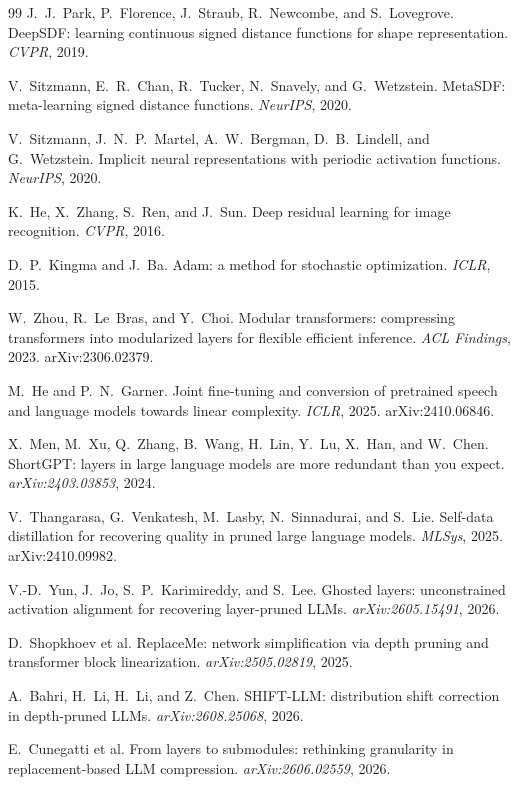 \documentclass[11pt]{article}
\begin{document}
\begin{thebibliography}{99}
J.~J.~Park, P.~Florence, J.~Straub, R.~Newcombe, and S.~Lovegrove.
DeepSDF: learning continuous signed distance functions for shape
representation.
\emph{CVPR}, 2019.

V.~Sitzmann, E.~R.~Chan, R.~Tucker, N.~Snavely, and G.~Wetzstein.
MetaSDF: meta-learning signed distance functions.
\emph{NeurIPS}, 2020.

V.~Sitzmann, J.~N.~P.~Martel, A.~W.~Bergman, D.~B.~Lindell, and
G.~Wetzstein.
Implicit neural representations with periodic activation functions.
\emph{NeurIPS}, 2020.

K.~He, X.~Zhang, S.~Ren, and J.~Sun.
Deep residual learning for image recognition.
\emph{CVPR}, 2016.

D.~P.~Kingma and J.~Ba.
Adam: a method for stochastic optimization.
\emph{ICLR}, 2015.

W.~Zhou, R.~Le~Bras, and Y.~Choi.
Modular transformers: compressing transformers into modularized
layers for flexible efficient inference.
\emph{ACL Findings}, 2023. arXiv:2306.02379.

M.~He and P.~N.~Garner.
Joint fine-tuning and conversion of pretrained speech and language
models towards linear complexity.
\emph{ICLR}, 2025. arXiv:2410.06846.

X.~Men, M.~Xu, Q.~Zhang, B.~Wang, H.~Lin, Y.~Lu, X.~Han, and
W.~Chen.
ShortGPT: layers in large language models are more redundant than
you expect.
\emph{arXiv:2403.03853}, 2024.

V.~Thangarasa, G.~Venkatesh, M.~Lasby, N.~Sinnadurai, and S.~Lie.
Self-data distillation for recovering quality in pruned large
language models.
\emph{MLSys}, 2025. arXiv:2410.09982.

V.-D.~Yun, J.~Jo, S.~P.~Karimireddy, and S.~Lee.
Ghosted layers: unconstrained activation alignment for
recovering layer-pruned LLMs.
\emph{arXiv:2605.15491}, 2026.

D.~Shopkhoev et al.
ReplaceMe: network simplification via depth pruning and
transformer block linearization.
\emph{arXiv:2505.02819}, 2025.

A.~Bahri, H.~Li, H.~Li, and Z.~Chen.
SHIFT-LLM: distribution shift correction in depth-pruned LLMs.
\emph{arXiv:2608.25068}, 2026.

E.~Cunegatti et al.
From layers to submodules: rethinking granularity in
replacement-based LLM compression.
\emph{arXiv:2606.02559}, 2026.


\end{thebibliography}
\end{document}
